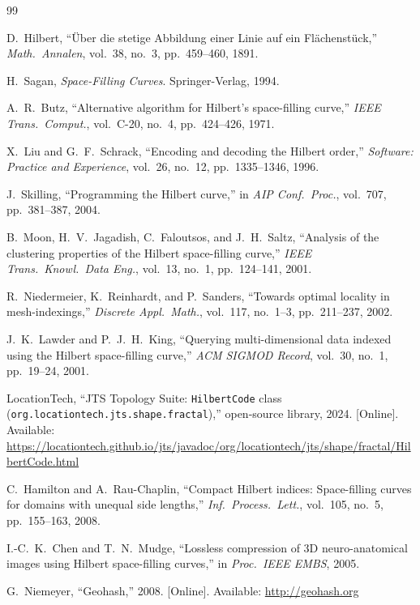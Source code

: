 \documentclass[11pt,a4paper]{article}
\theoremstyle{plain}
\theoremstyle{definition}
\theoremstyle{remark}
\begin{document}
\begin{thebibliography}{99}
\raggedright
\sloppy

D.~Hilbert, ``\"Uber die stetige Abbildung einer Linie auf ein
Fl\"achenst\"uck,'' \emph{Math.\ Annalen}, vol.~38, no.~3,
pp.~459--460, 1891.

H.~Sagan, \emph{Space-Filling Curves}. Springer-Verlag, 1994.

A.~R.~Butz, ``Alternative algorithm for Hilbert's space-filling curve,''
\emph{IEEE Trans.\ Comput.}, vol.~C-20, no.~4, pp.~424--426, 1971.

X.~Liu and G.~F.~Schrack, ``Encoding and decoding the Hilbert order,''
\emph{Software: Practice and Experience}, vol.~26, no.~12,
pp.~1335--1346, 1996.

J.~Skilling, ``Programming the Hilbert curve,'' in \emph{AIP Conf.\
Proc.}, vol.~707, pp.~381--387, 2004.

B.~Moon, H.~V.~Jagadish, C.~Faloutsos, and J.~H.~Saltz, ``Analysis of
the clustering properties of the Hilbert space-filling curve,''
\emph{IEEE Trans.\ Knowl.\ Data Eng.}, vol.~13, no.~1, pp.~124--141, 2001.

R.~Niedermeier, K.~Reinhardt, and P.~Sanders, ``Towards optimal
locality in mesh-indexings,'' \emph{Discrete Appl.\ Math.}, vol.~117,
no.~1--3, pp.~211--237, 2002.

J.~K.~Lawder and P.~J.~H.~King, ``Querying multi-dimensional data
indexed using the Hilbert space-filling curve,''
\emph{ACM SIGMOD Record}, vol.~30, no.~1, pp.~19--24, 2001.

LocationTech, ``JTS Topology Suite: \texttt{HilbertCode} class
(\texttt{org.locationtech.jts.shape.fractal}),'' open-source library,
2024. [Online]. Available:
\url{https://locationtech.github.io/jts/javadoc/org/locationtech/jts/shape/fractal/HilbertCode.html}

C.~Hamilton and A.~Rau-Chaplin, ``Compact Hilbert indices: Space-filling
curves for domains with unequal side lengths,''
\emph{Inf.\ Process.\ Lett.}, vol.~105, no.~5, pp.~155--163, 2008.

I.-C.~K.~Chen and T.~N.~Mudge, ``Lossless compression of 3D
neuro-anatomical images using Hilbert space-filling curves,'' in
\emph{Proc.\ IEEE EMBS}, 2005.

G.~Niemeyer, ``Geohash,'' 2008. [Online]. Available:
\url{http://geohash.org}


\end{thebibliography}
\end{document}
